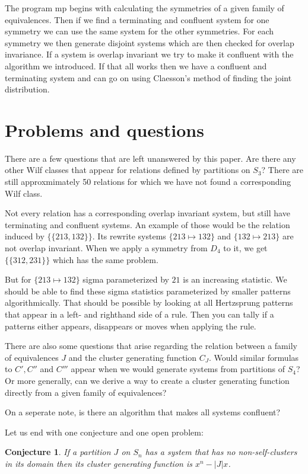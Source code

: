 \documentclass[a4paper, 11pt, english]{article}
\newcommand{\patternrule}{ \mapsto \!}
\newtheorem{conjecture}[theorem]{Conjecture}
\theoremstyle{definition}
\newcommand{\Sym}{S}
\begin{document}
The program mp begins with calculating the symmetries of a given family of equivalences. Then if we
find a terminating and confluent system for one symmetry we can use the same system for the other
symmetries. For each symmetry we then generate disjoint systems which are then checked for overlap
invariance. If a system is overlap invariant we try to make it confluent with the algorithm we
introduced. If that all works then we have a confluent and terminating system and can go on using
Claesson's method of finding the joint distribution.


\section{Problems and questions}

There are a few questions that are left unanswered by this paper.
Are there any other Wilf classes that appear for relations defined by partitions on $\Sym_3$? There are
still approxmimately 50 relations for which we have not found a corresponding Wilf class. 

Not every relation has a corresponding overlap invariant system, but still have terminating and
confluent systems. An example of those would be the relation induced by $\{ \{ 213, 132
\} \}$. Its rewrite systems ${\{ 213 \patternrule 132 \}}$ and ${\{
132 \patternrule 213 \}}$ are not overlap invariant. When we
apply a symmetry from $D_4$ to it, we get $\{ \{ 312, 231 \} \}$ which has the same
problem.

But for $\{ 213 \patternrule 132 \}$ sigma parameterized by $21$ is an increasing statistic. We
should be able to find these sigma statistics parameterized by smaller patterns algorithmically.
That should be possible by looking at all Hertzsprung patterns that appear in a left- and righthand
side of a rule. Then you can tally if a patterns either appears, disappears or moves when applying the rule.

There are also some questions that arise regarding the relation between a family of equivalences $J$ and
the cluster generating function $C_J$.
Would similar formulas to $C', C''$ and $C'''$ appear when we would
generate systems from partitions of $\Sym_4$? 
Or more generally, 
can we derive a way to create a cluster generating function directly from a
given family of equivalences? 

On a seperate note,
is there an algorithm that makes all systems confluent?

Let us end with one conjecture and one open problem:
\begin{conjecture}
    If a partition $J$ on $\Sym_n$ has a system that has no non-self-clusters in
    its domain then its cluster generating function is $x^n-|J|x$.
\end{conjecture}
\end{document}
